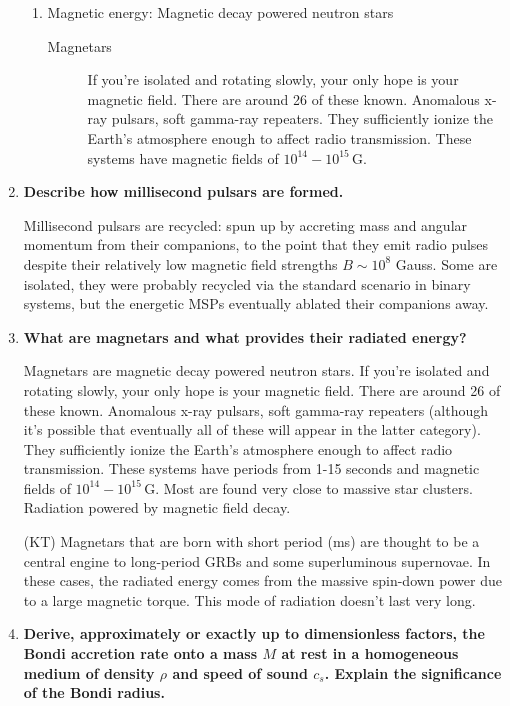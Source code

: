 \documentclass[a4paper]{article}
\begin{document}
\begin{enumerate}
\begin{enumerate}
\item Magnetic energy: Magnetic decay powered neutron stars

\begin{description}
\item[Magnetars] If you're isolated and rotating slowly, your only hope is your magnetic field. There are around 26 of these known. Anomalous x-ray pulsars, soft gamma-ray repeaters. They sufficiently ionize the Earth's atmosphere enough to affect radio transmission. These systems have magnetic fields of $10^{14}-10^{15}\,$G.
\end{description}

\end{enumerate}

\item \textbf{Describe how millisecond pulsars are formed.}

Millisecond pulsars are recycled: spun up by accreting mass and angular momentum from their companions, to the point that they emit radio pulses despite their relatively low magnetic field strengths $B \sim 10^8$ Gauss. Some are isolated, they were probably recycled via the standard scenario in binary systems, but the energetic MSPs eventually ablated their companions away. 

\item \textbf{What are magnetars and what provides their radiated energy?}

Magnetars are magnetic decay powered neutron stars. 
If you're isolated and rotating slowly, your only hope is your magnetic field. There are around 26 of these known. Anomalous x-ray pulsars, soft gamma-ray repeaters (although it's possible that eventually all of these will appear in the latter category). They sufficiently ionize the Earth's atmosphere enough to affect radio transmission. These systems have periods from 1-15 seconds and magnetic fields of $10^{14}-10^{15}\,$G. Most are found very close to massive star clusters. 
Radiation powered by magnetic field decay.

(KT) Magnetars that are born with short period (ms) are thought to be a central engine to long-period GRBs and some superluminous supernovae. In these cases, the radiated energy comes from the massive spin-down power due to a large magnetic torque. This mode of radiation doesn't last very long. 

\item \textbf{Derive, approximately or exactly up to dimensionless factors, the Bondi accretion rate onto a mass $M$ at rest in a homogeneous medium of density $\rho$ and speed of sound $c_s$. Explain the significance of the Bondi radius.}


\end{enumerate}
\end{document}
